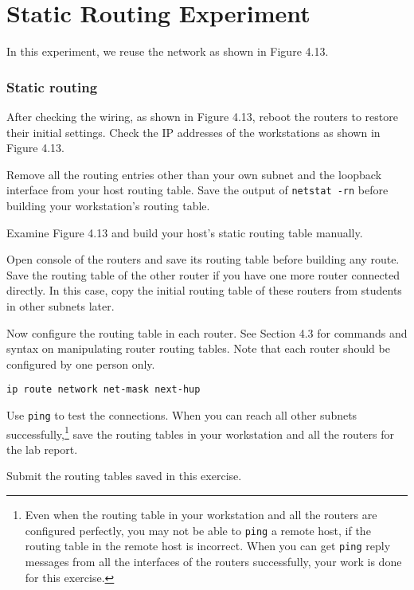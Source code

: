 \documentclass{../UTNetLab}
\begin{document}
\part{Static Routing Experiment}
    In this experiment, we reuse the network as shown in Figure 4.13.
\section{Static routing}
    After checking the wiring, as shown in Figure 4.13, reboot the routers to restore their initial settings.
    Check the IP addresses of the workstations as shown in Figure 4.13. 

    Remove all the routing entries other than your own subnet and the loopback interface from your host routing table.
    Save the output of \lstinline{netstat -rn} before building your workstation’s routing table. 

    Examine Figure 4.13 and build your host’s static routing table manually. 

    Open console of the routers and save its routing table before building any route.
    Save the routing table of the other router if you have one more router connected directly.
    In this case, copy the initial routing table of these routers from students in other subnets later. 

    Now configure the routing table in each router.
    See Section 4.3 for commands and syntax on manipulating router routing tables.
    Note that each router should be configured by one person only. 

    \begin{lstlisting}[language={cisco}, emph={network, net-mask, next-hup}]
ip route network net-mask next-hup
    \end{lstlisting}

    Use \lstinline{ping} to test the connections.
    When you can reach all other subnets successfully,\footnote{Even when the routing table in your workstation and all the routers are configured perfectly, you may not be able to \lstinline{ping} a remote host, if the routing table in the remote host is incorrect.
    When you can get \lstinline{ping} reply messages from all the interfaces of the routers successfully, your work is done for this exercise.} save the routing tables in your workstation and all the routers for the lab report.
    
    \begin{report}
    \item Submit the routing tables saved in this exercise.
    \end{report}
\end{document}
